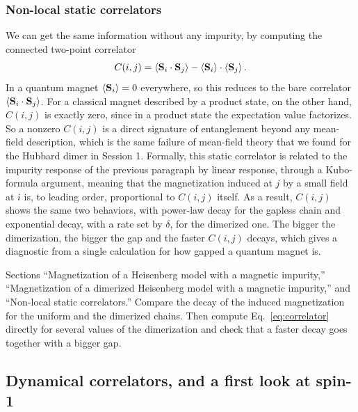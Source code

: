 \documentclass[lecture_notes.tex]{subfiles}
\begin{document}
\subsubsection{Non-local static correlators}
We can get the same information without any impurity, by
computing the connected two-point correlator
\begin{equation}
  C(i,j) = \expval{\vb S_i\cdot\vb S_j} - \expval{\vb S_i}\cdot\expval{\vb S_j}.
  \label{eq:correlator}
\end{equation}
In a quantum magnet $\expval{\vb S_i}=0$ everywhere, so this reduces to the bare correlator
$\expval{\vb S_i\cdot\vb S_j}$. For a classical magnet described by a product state, on the other
hand, $C(i,j)$ is exactly zero, since in a product state the expectation value factorizes. So a
nonzero $C(i,j)$ is a direct signature of entanglement beyond any mean-field description, which is
the same failure of mean-field theory that we found for the Hubbard dimer in Session 1. Formally,
this static correlator is related to the impurity response of the previous paragraph by linear
response, through a Kubo-formula argument, meaning that the magnetization induced at $j$ by a small
field at $i$ is, to leading order, proportional to $C(i,j)$ itself. As a result, $C(i,j)$ shows the
same two behaviors, with power-law decay for the gapless chain and exponential decay, with a rate set
by $\delta$, for the dimerized one. The bigger the dimerization, the bigger the gap and the faster
$C(i,j)$ decays, which gives a diagnostic from a single calculation for how gapped a quantum magnet
is.

\begin{notebook}
Sections ``Magnetization of a Heisenberg model with a magnetic impurity,'' ``Magnetization of a
dimerized Heisenberg model with a magnetic impurity,'' and ``Non-local static correlators.'' Compare
the decay of the induced magnetization for the uniform and the dimerized chains. Then compute
Eq.~\eqref{eq:correlator} directly for several values of the dimerization and check that a faster
decay goes together with a bigger gap.
\end{notebook}

\subsection{Dynamical correlators, and a first look at spin-1}
\label{sec:dynamical}
\end{document}
